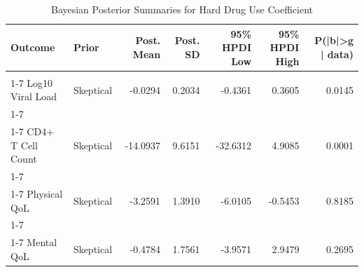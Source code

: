 \begin{table}[!h]
\centering
\caption{\label{tab:posterior-table}Bayesian Posterior Summaries for Hard Drug Use Coefficient}
\centering
\begin{tabular}[t]{llrrrrr}
\toprule
Outcome & Prior & Post. Mean & Post. SD & 95\% HPDI Low & 95\% HPDI High & P(|b|>g | data)\\
\midrule
\cellcolor{gray!10}{Log10 Viral Load} & \cellcolor{gray!10}{Vague} & \cellcolor{gray!10}{-0.0292} & \cellcolor{gray!10}{0.2021} & \cellcolor{gray!10}{-0.4240} & \cellcolor{gray!10}{0.3698} & \cellcolor{gray!10}{0.0142}\\
\cmidrule{1-7}
Log10 Viral Load & Skeptical & -0.0294 & 0.2034 & -0.4361 & 0.3605 & 0.0145\\
\cmidrule{1-7}
\cellcolor{gray!10}{CD4+ T Cell Count} & \cellcolor{gray!10}{Vague} & \cellcolor{gray!10}{-148.5597} & \cellcolor{gray!10}{30.4498} & \cellcolor{gray!10}{-208.0764} & \cellcolor{gray!10}{-88.9637} & \cellcolor{gray!10}{0.9993}\\
\cmidrule{1-7}
CD4+ T Cell Count & Skeptical & -14.0937 & 9.6151 & -32.6312 & 4.9085 & 0.0001\\
\cmidrule{1-7}
\cellcolor{gray!10}{Physical QoL} & \cellcolor{gray!10}{Vague} & \cellcolor{gray!10}{-3.3212} & \cellcolor{gray!10}{1.3998} & \cellcolor{gray!10}{-6.1056} & \cellcolor{gray!10}{-0.6037} & \cellcolor{gray!10}{0.8273}\\
\cmidrule{1-7}
Physical QoL & Skeptical & -3.2591 & 1.3910 & -6.0105 & -0.5453 & 0.8185\\
\cmidrule{1-7}
\cellcolor{gray!10}{Mental QoL} & \cellcolor{gray!10}{Vague} & \cellcolor{gray!10}{-0.4917} & \cellcolor{gray!10}{1.7717} & \cellcolor{gray!10}{-3.9648} & \cellcolor{gray!10}{2.9701} & \cellcolor{gray!10}{0.2766}\\
\cmidrule{1-7}
Mental QoL & Skeptical & -0.4784 & 1.7561 & -3.9571 & 2.9479 & 0.2695\\
\bottomrule
\end{tabular}
\end{table}
